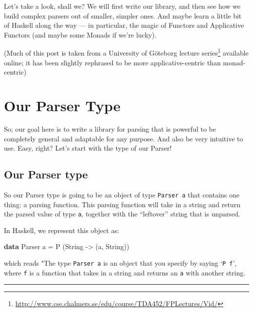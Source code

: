 \documentclass[]{article}
\newenvironment{Shaded}{}{}
\newcommand{\DataTypeTok}[1]{\textcolor[rgb]{0.56,0.13,0.00}{#1}}
\newcommand{\KeywordTok}[1]{\textcolor[rgb]{0.00,0.44,0.13}{\textbf{#1}}}
\newcommand{\NormalTok}[1]{#1}
\newcommand{\OtherTok}[1]{\textcolor[rgb]{0.00,0.44,0.13}{#1}}
\renewcommand{\href}[2]{#2\footnote{\url{#1}}}
\begin{document}
Let's take a look, shall we? We will first write our library, and then see how
we build complex parsers out of smaller, simpler ones. And maybe learn a little
bit of Haskell along the way --- in particular, the magic of Functors and
Applicative Functors (and maybe some Monads if we're lucky).

(Much of this post is taken from a University of Göteborg
\href{http://www.cse.chalmers.se/edu/course/TDA452/FPLectures/Vid/}{lecture
series} available online; it has been slightly rephrased to be more
applicative-centric than monad-centric)

\hypertarget{our-parser-type}{%
\section{Our Parser Type}\label{our-parser-type}}

So; our goal here is to write a library for parsing that is powerful to be
completely general and adaptable for any purpose. And also be very intuitive to
use. Easy, right? Let's start with the type of our Parser!

\hypertarget{our-parser-type-1}{%
\subsection{Our Parser type}\label{our-parser-type-1}}

So our Parser type is going to be an object of type \texttt{Parser\ a} that
contains one thing: a parsing function. This parsing function will take in a
string and return the parsed value of type \texttt{a}, together with the
``leftover'' string that is unparsed.

In Haskell, we represent this object as:

\begin{Shaded}
\begin{Highlighting}[]
\KeywordTok{data} \DataTypeTok{Parser}\NormalTok{ a }\OtherTok{=} \DataTypeTok{P}\NormalTok{ (}\DataTypeTok{String} \OtherTok{{-}>}\NormalTok{ (a, }\DataTypeTok{String}\NormalTok{))}
\end{Highlighting}
\end{Shaded}

which reads "The type \texttt{Parser\ a} is an object that you specify by saying
`\texttt{P\ f}', where \texttt{f} is a function that takes in a string and
returns an \texttt{a} with another string.

\begin{center}\rule{0.5\linewidth}{\linethickness}\end{center}
\end{document}
